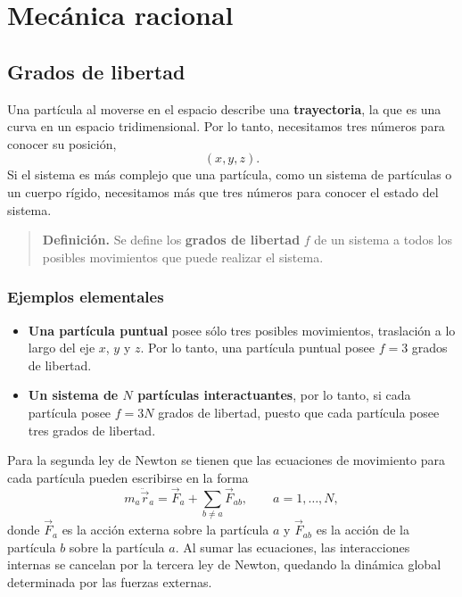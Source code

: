 \documentclass[../apunte_mecanica_clasica.tex]{subfiles}%
\begin{document}
\chapter{Mecánica racional}
\label{ch:mecanica-racional}

\section{Grados de libertad}
\label{sec:mr-grados-libertad}

Una partícula al moverse en el espacio describe una \textbf{trayectoria}, la que es una curva en un espacio tridimensional. Por lo tanto, necesitamos tres números para conocer su posición,
\begin{equation}
    (x,y,z).
    \label{eq:mr-posicion-cartesiana}
\end{equation}
Si el sistema es más complejo que una partícula, como un sistema de partículas o un cuerpo rígido, necesitamos más que tres números para conocer el estado del sistema.

\begin{quote}
\textbf{Definición.} Se define los \textbf{grados de libertad} $f$ de un sistema a todos los posibles movimientos que puede realizar el sistema.
\end{quote}

\subsection{Ejemplos elementales}
\label{subsec:mr-ejemplos-grados}

\begin{itemize}
    \item \textbf{Una partícula puntual} posee sólo tres posibles movimientos, traslación a lo largo del eje $x$, $y$ y $z$. Por lo tanto, una partícula puntual posee $f=3$ grados de libertad.
    \item \textbf{Un sistema de $N$ partículas interactuantes}, por lo tanto, si cada partícula posee $f=3N$ grados de libertad, puesto que cada partícula posee tres grados de libertad.
\end{itemize}

Para la segunda ley de Newton se tienen que las ecuaciones de movimiento para cada partícula pueden escribirse en la forma
\begin{equation}
    m_a \ddot{\vec r}_a = \vec F_a + \sum_{b\neq a}\vec F_{ab},
    \qquad a=1,\dots,N,
    \label{eq:mr-newton-n-particulas}
\end{equation}
donde $\vec F_a$ es la acción externa sobre la partícula $a$ y $\vec F_{ab}$ es la acción de la partícula $b$ sobre la partícula $a$. Al sumar las ecuaciones, las interacciones internas se cancelan por la tercera ley de Newton, quedando la dinámica global determinada por las fuerzas externas.
\end{document}
